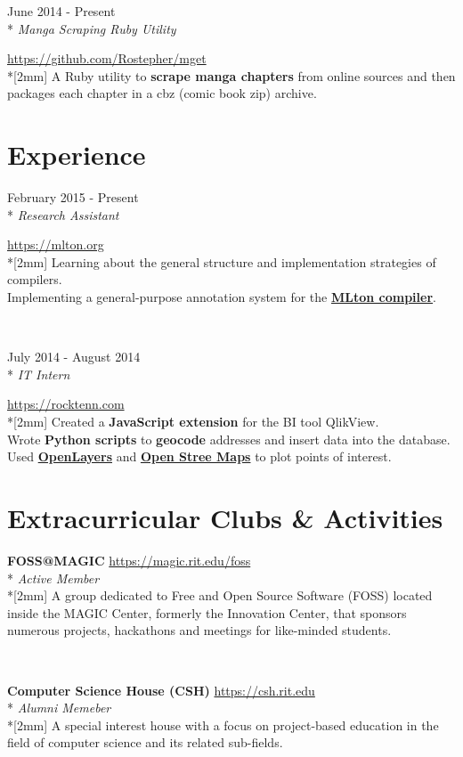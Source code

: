 \documentclass[a4paper,margin,line]{resume}
\newcommand{\rvspace}{2mm} %
\newcommand{\rurl}[1]{\hfill {\footnotesize \url{#1}}}
\newcommand{\rdate}[1]{\hfill {\small #1}}
\newcommand{\rdescription}[1]{\small #1 \normalsize}
\newcommand{\ritem}[5] {
    \item[#1]                               %
    \hfill \rdate{#2} \\*                   %
    \hfill {\small \emph{#3}}               %
    \strut \hfill \rurl{#4} \\*[\rvspace]   %
    \rdescription{#5}                       %
}
\newcommand{\remployer}{\ritem}
\newcommand{\rproject}{\ritem}
\newcommand{\rorganization}[4] {
    \item{\bf #1}                           %
    \rurl{#2} \\*                           %
    \hfill {\small \emph{#3}} \\*[\rvspace] %
    \rdescription{#4}                       %
}
\begin{document}
\begin{resume}
\begin{asparadesc}
        \rproject {mget}
                  {June 2014 - Present}
                  {Manga Scraping Ruby Utility}
                  {https://github.com/Rostepher/mget}
        {
            A Ruby utility to {\bf scrape manga chapters} from online sources
            and then packages each chapter in a cbz (comic book zip) archive.
        }
    \end{asparadesc}

\section{\mysidestyle Experience}
	\begin{asparadesc}
        \remployer {Rochester Institute of Technology}
                   {February 2015 - Present}
                   {Research Assistant}
                   {https://mlton.org}
        {
            Learning about the general structure and implementation strategies
            of compilers.\\
            Implementing a general-purpose annotation system for the
            \href{https://mlton.org}{\bf MLton compiler}.
        }
        \\

        \remployer {RockTenn}
                   {July 2014 - August 2014}
                   {IT Intern}
                   {https://rocktenn.com}
        {
            Created a {\bf JavaScript extension} for the BI tool QlikView.\\
            Wrote {\bf Python scripts} to {\bf geocode} addresses and insert
            data into the database.\\
            Used \href{https://openlayers.org}{\bf OpenLayers} and
            \href{https://openstreetmap.org}{\bf Open Stree Maps} to plot points
            of interest.
	    }
    \end{asparadesc}

\section{\mysidestyle Extracurricular Clubs \& Activities}
	\begin{asparablank}
        \rorganization {FOSS@MAGIC}
                       {https://magic.rit.edu/foss}
                       {Active Member}
        {
            A group dedicated to Free and Open Source Software (FOSS) located
            inside the MAGIC Center, formerly the Innovation Center, that
            sponsors numerous projects, hackathons and meetings for like-minded
            students.
        }
        \\

        \rorganization {Computer Science House ({\small CSH})}
                       {https://csh.rit.edu}
                       {Alumni Memeber}
        {
            A special interest house with a focus on project-based education in
            the field of computer science and its related sub-fields.
        }
    \end{asparablank}
\end{resume}
\end{document}
